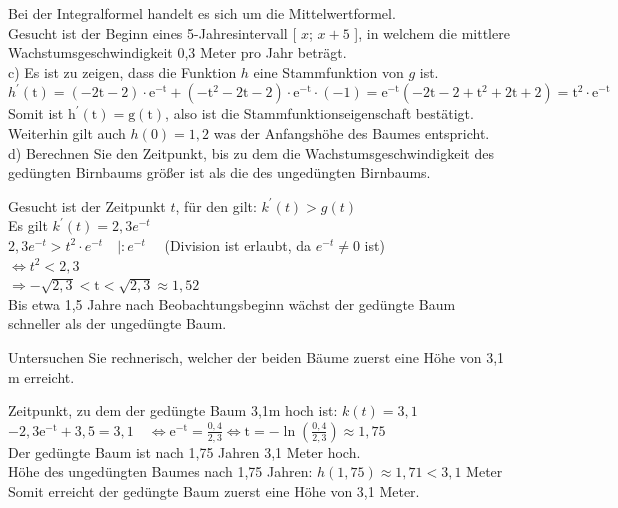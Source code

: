 \documentclass[10pt]{article}
\begin{document}
Bei der Integralformel handelt es sich um die Mittelwertformel.\\
Gesucht ist der Beginn eines 5-Jahresintervall [ $x$; $x+5$ ], in welchem die mittlere Wachstumsgeschwindigkeit 0,3 Meter pro Jahr beträgt.\\
c) Es ist zu zeigen, dass die Funktion $h$ eine Stammfunktion von $g$ ist.\\
$h^{\prime}(\mathrm{t})=(-2 \mathrm{t}-2) \cdot \mathrm{e}^{-\mathrm{t}}+\left(-\mathrm{t}^{2}-2 \mathrm{t}-2\right) \cdot \mathrm{e}^{-\mathrm{t}} \cdot(-1)=\mathrm{e}^{-\mathrm{t}}\left(-2 \mathrm{t}-2+\mathrm{t}^{2}+2 \mathrm{t}+2\right)=\mathrm{t}^{2} \cdot \mathrm{e}^{-\mathrm{t}}$\\
Somit ist $\mathrm{h}^{\prime}(\mathrm{t})=\mathrm{g}(\mathrm{t})$, also ist die Stammfunktionseigenschaft bestätigt.\\
Weiterhin gilt auch $h(0)=1,2$ was der Anfangshöhe des Baumes entspricht.\\
d) Berechnen Sie den Zeitpunkt, bis zu dem die Wachstumsgeschwindigkeit des gedüngten Birnbaums größer ist als die des ungedüngten Birnbaums.

Gesucht ist der Zeitpunkt $t$, für den gilt: $k^{\prime}(t)>g(t)$\\
Es gilt $k^{\prime}(t)=2,3 e^{-t}$\\
$2,3 e^{-t}>t^{2} \cdot e^{-t} \quad \mid: e^{-t} \quad$ (Division ist erlaubt, da $e^{-t} \neq 0$ ist)\\
$\Leftrightarrow t^{2}<2,3$\\
$\Rightarrow-\sqrt{2,3}<\mathrm{t}<\sqrt{2,3} \approx 1,52$\\
Bis etwa 1,5 Jahre nach Beobachtungsbeginn wächst der gedüngte Baum schneller als der ungedüngte Baum.

Untersuchen Sie rechnerisch, welcher der beiden Bäume zuerst eine Höhe von 3,1 m erreicht.

Zeitpunkt, zu dem der gedüngte Baum 3,1m hoch ist: $k(t)=3,1$\\
$-2,3 \mathrm{e}^{-\mathrm{t}}+3,5=3,1 \quad \Leftrightarrow \mathrm{e}^{-\mathrm{t}}=\frac{0,4}{2,3} \Leftrightarrow \mathrm{t}=-\ln \left(\frac{0,4}{2,3}\right) \approx 1,75$\\
Der gedüngte Baum ist nach 1,75 Jahren 3,1 Meter hoch.\\
Höhe des ungedüngten Baumes nach 1,75 Jahren: $h(1,75) \approx 1,71<3,1$ Meter\\
Somit erreicht der gedüngte Baum zuerst eine Höhe von 3,1 Meter.
\end{document}
